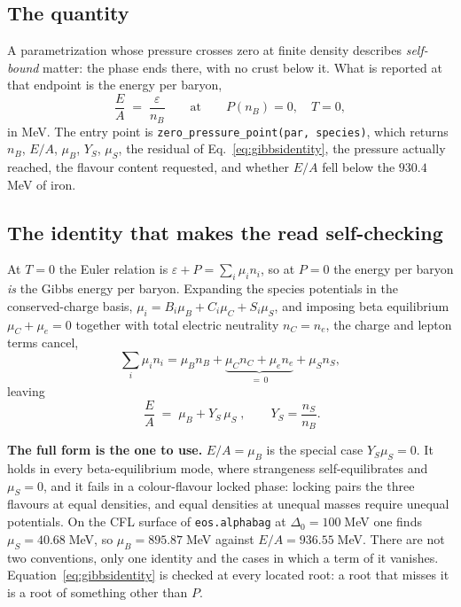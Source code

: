 \documentclass[aps,prc,onecolumn,superscriptaddress,nofootinbib,10pt]{revtex4-2}
\begin{document}
\subsection{The quantity}

A parametrization whose pressure crosses zero at finite density describes
\emph{self-bound} matter: the phase ends there, with no crust below it. What is
reported at that endpoint is the energy per baryon,
%
\begin{equation}
  \frac{E}{A} \;=\; \frac{\varepsilon}{n_B}
  \qquad\text{at}\qquad P(n_B) = 0,\quad T = 0 ,
\end{equation}
%
in MeV. The entry point is \texttt{zero\_pressure\_point(par, species)}, which
returns $n_B$, $E/A$, $\mu_B$, $Y_S$, $\mu_S$, the residual of
Eq.~\eqref{eq:gibbsidentity}, the pressure actually reached, the flavour
content requested, and whether $E/A$ fell below the $930.4\;$MeV of iron.

\subsection{The identity that makes the read self-checking}

At $T = 0$ the Euler relation is $\varepsilon + P = \sum_i \mu_i n_i$, so at
$P = 0$ the energy per baryon \emph{is} the Gibbs energy per baryon. Expanding
the species potentials in the conserved-charge basis,
$\mu_i = B_i\mu_B + C_i\mu_C + S_i\mu_S$, and imposing beta equilibrium
$\mu_C + \mu_e = 0$ together with total electric neutrality $n_C = n_e$, the
charge and lepton terms cancel,
%
\begin{equation}
  \sum_i \mu_i n_i
    = \mu_B n_B + \underbrace{\mu_C n_C + \mu_e n_e}_{=\,0} + \mu_S n_S ,
\end{equation}
%
leaving
%
\begin{equation}
  \boxed{\;\frac{E}{A} \;=\; \mu_B + Y_S\,\mu_S\;} ,
  \qquad Y_S = \frac{n_S}{n_B} .
  \label{eq:gibbsidentity}
\end{equation}

\textbf{The full form is the one to use.} $E/A = \mu_B$ is the special case
$Y_S\mu_S = 0$. It holds in every beta-equilibrium mode, where strangeness
self-equilibrates and $\mu_S = 0$, and it fails in a colour-flavour locked
phase: locking pairs the three flavours at equal densities, and equal densities
at unequal masses require unequal potentials. On the CFL surface of
\texttt{eos.alphabag} at $\Delta_0 = 100\;$MeV one finds
$\mu_S = 40.68\;$MeV, so $\mu_B = 895.87\;$MeV against
$E/A = 936.55\;$MeV. There are not two conventions, only one identity and the
cases in which a term of it vanishes. Equation~\eqref{eq:gibbsidentity} is
checked at every located root: a root that misses it is a root of something
other than $P$.
\end{document}
